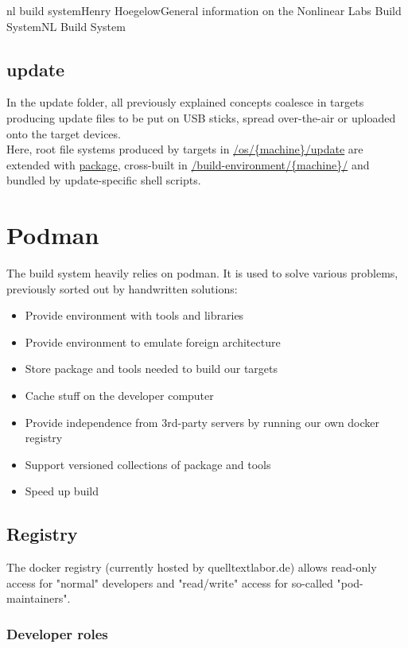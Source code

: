 \documentclass[11pt]{article}
\begin{document}
\begin{Name}{1}{nl build system}{Henry Hoegelow}{General information on the Nonlinear Labs Build System}{NL Build System}
\subsection{update}
In the update folder, all previously explained concepts coalesce in targets producing update files to be put on USB sticks, spread over-the-air or uploaded onto the target devices.\\
Here, root file systems produced by targets in \hyperref[os-update]{/os/\{machine\}/update} are extended with \hyperref[package]{package}, cross-built in \hyperref[buildenv]{/build-environment/\{machine\}/} and bundled by update-specific shell scripts.

\section{Podman} \label{pod}
The build system heavily relies on podman. It is used to solve various problems, previously sorted out by handwritten solutions:
\begin{itemize}
\item Provide environment with tools and libraries
\item Provide environment to emulate foreign architecture
\item Store package and tools needed to build our targets
\item Cache stuff on the developer computer
\item Provide independence from 3rd-party servers by running our own docker registry
\item Support versioned collections of package and tools
\item Speed up build
\end{itemize}

\subsection{Registry}
The docker registry (currently hosted by quelltextlabor.de) allows read-only access for "normal" developers and "read/write" access for so-called "pod-maintainers".

\subsubsection{Developer roles}

\end{Name}
\end{document}
